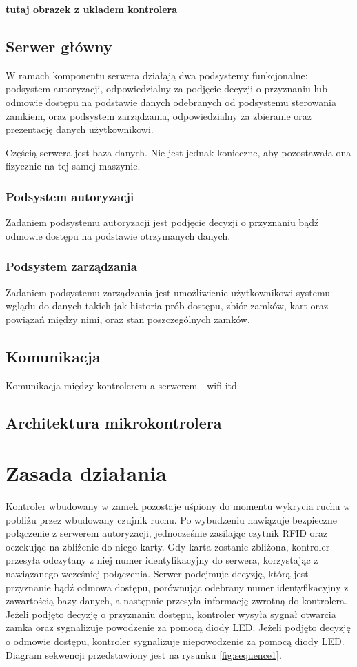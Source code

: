 \textbf{tutaj obrazek z ukladem kontrolera}

\subsection{Serwer główny}
W ramach komponentu serwera działają dwa podsystemy funkcjonalne: podsystem autoryzacji, odpowiedzialny za podjęcie decyzji o przyznaniu lub odmowie dostępu na podstawie danych odebranych od podsystemu sterowania zamkiem, oraz podsystem zarządzania, odpowiedzialny za zbieranie oraz prezentację danych użytkownikowi.

Częścią serwera jest baza danych. Nie jest jednak konieczne, aby pozostawała ona fizycznie na tej samej maszynie.

\subsubsection{Podsystem autoryzacji}
Zadaniem podsystemu autoryzacji jest podjęcie decyzji o przyznaniu bądź odmowie dostępu na podstawie otrzymanych danych.

\subsubsection{Podsystem zarządzania}
Zadaniem podsystemu zarządzania jest umożliwienie użytkownikowi systemu wglądu do danych takich jak historia prób dostępu, zbiór zamków, kart oraz powiązań między nimi, oraz stan poszczególnych zamków.

\subsection{Komunikacja}

Komunikacja między kontrolerem a serwerem - wifi itd

\subsection{Architektura mikrokontrolera}

\section{Zasada działania}
Kontroler wbudowany w zamek pozostaje uśpiony do momentu wykrycia ruchu w pobliżu przez wbudowany czujnik ruchu. Po wybudzeniu nawiązuje bezpieczne połączenie z serwerem autoryzacji, jednocześnie zasilając czytnik RFID oraz oczekując na zbliżenie do niego karty. Gdy karta zostanie zbliżona, kontroler przesyła odczytany z niej numer identyfikacyjny do serwera, korzystając z nawiązanego wcześniej połączenia. Serwer podejmuje decyzję, którą jest przyznanie bądź odmowa dostępu, porównując odebrany numer identyfikacyjny z zawartością bazy danych, a następnie przesyła informację zwrotną do kontrolera. Jeżeli podjęto decyzję o przyznaniu dostępu, kontroler wysyła sygnał otwarcia zamka oraz sygnalizuje powodzenie za pomocą diody LED. Jeżeli podjęto decyzję o odmowie dostępu, kontroler sygnalizuje niepowodzenie za pomocą diody LED. Diagram sekwencji przedstawiony jest na rysunku \ref{fig:sequence1}.

